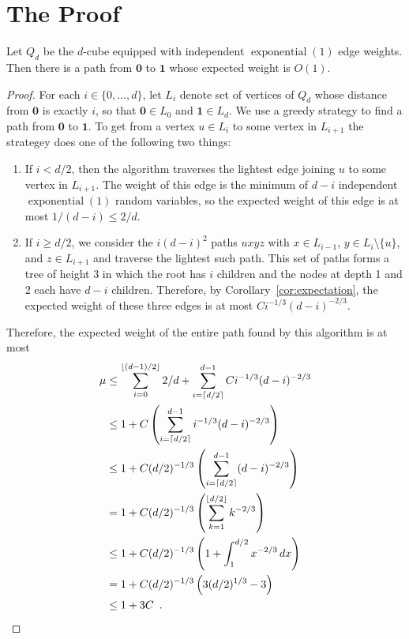 \documentclass[a4paper,UKenglish]{lipics-v2016}
\DeclareMathOperator{\exponential}{exponential}
\newcommand{\zero}{\mathbf{0}}
\newcommand{\one}{\mathbf{1}}
\begin{document}
\section{The Proof}


\begin{theorem}
  Let $Q_d$ be the $d$-cube equipped with independent $\exponential(1)$
  edge weights.  Then there is a path from $\zero$ to $\one$ whose
  expected weight is $O(1)$.
\end{theorem}

\begin{proof}
  For each $i\in\{0,\ldots,d\}$, let $L_i$ denote set of vertices of $Q_d$
  whose distance from $\zero$ is exactly $i$, so that $\zero\in L_0$ and
  $\one\in L_d$.  We use a greedy strategy to find a path from $\zero$
  to $\one$.  To get from a vertex $u\in L_i$ to some vertex in $L_{i+1}$
  the strategey does one of the following two things:
  \begin{enumerate}
     \item If $i < d/2$, then the algorithm traverses the lightest edge
     joining $u$ to some vertex in $L_{i+1}$.  The weight of this edge is
     the minimum of $d-i$ independent $\exponential(1)$ random variables,
     so the expected weight of this edge is at most $1/(d-i)\le 2/d$.

     \item If $i \ge d/2$, we consider the $i(d-i)^2$ paths $uxyz$ with
     $x\in L_{i-1}$, $y\in L_i\setminus\{u\}$, and $z\in L_{i+1}$
     and traverse the lightest such path.  This set of paths forms
     a tree of height 3 in which the root has $i$ children and the
     nodes at depth 1 and 2 each have $d-i$ children.  Therefore, by
     Corollary~\ref{cor:expectation}, the expected weight of these three
     edges is at most $Ci^{-1/3}(d-i)^{-2/3}$.
  \end{enumerate}
  Therefore, the expected weight of the entire path found by this
  algorithm is at most
  \begin{align*}
    \mu & \le \sum_{i=0}^{\lfloor (d-1)/2\rfloor} 2/d 
               + \sum_{i=\lceil d/2\rceil}^{d-1} Ci^{-1/3}(d-i)^{-2/3} \\
        & \le 1 
               + C\left(\sum_{i=\lceil d/2\rceil}^{d-1} i^{-1/3}(d-i)^{-2/3}\right) \\
        & \le 1 
               + C(d/2)^{-1/3}\left(\sum_{i=\lceil d/2\rceil}^{d-1} (d-i)^{-2/3}\right) \\
        & = 1 
               + C(d/2)^{-1/3}\left(\sum_{k=1}^{\lfloor d/2\rfloor}k^{-2/3}\right) \\
        & \le 1
               + C(d/2)^{-1/3}\left(1+\int_1^{d/2}x^{-2/3}\,dx\right) \\
        & = 1
               + C(d/2)^{-1/3}\left(3(d/2)^{1/3}-3\right) \\
        & \le 1
               + 3C \enspace . \qedhere
  \end{align*}
\end{proof}
\end{document}
